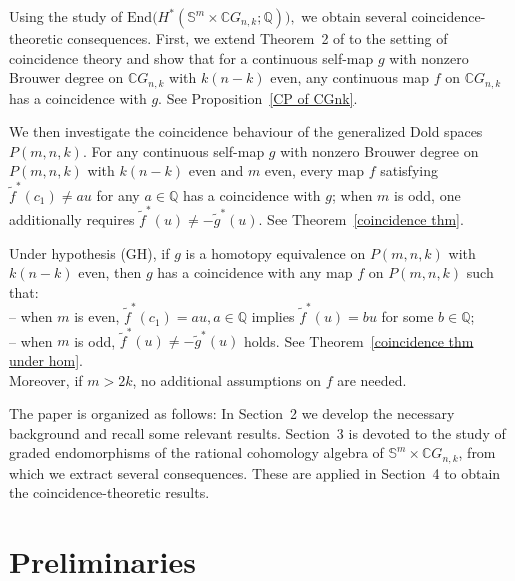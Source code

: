 \documentclass{amsart}
\begin{document}
	Using the study of $\mathrm{End}\bigl(H^*(\mathbb S^{m}\times \mathbb C G_{n,k};\mathbb Q)\bigr),$
	we obtain several coincidence-theoretic consequences. First, we extend Theorem~2 of \cite{glover-homer} to the setting of coincidence theory and show that for a continuous self-map $g$ with nonzero Brouwer degree on $\mathbb C G_{n,k}$ with $k(n-k)$ even, any continuous map $f$ on $\mathbb CG_{n,k}$ has a coincidence with $g$. See Proposition~\ref{CP of CGnk}.
	
	We then investigate the coincidence behaviour of the generalized Dold spaces $P(m,n,k)$. For any continuous self-map $g$ with nonzero Brouwer degree on $P(m,n,k)$  with $k(n-k)$ even and $m$ even, every map $f$ satisfying $\tilde f^{*}(c_1)\neq a u$ for any $a\in\mathbb Q$ has a coincidence with $g$; when $m$ is odd, one additionally requires $\tilde f^{*}(u)\neq -\tilde g^{*}(u)$. See Theorem~\ref{coincidence thm}.
	
	Under hypothesis (GH), if $g$ is a homotopy equivalence on $P(m,n,k)$ with $k(n-k)$ even, then $g$ has a coincidence with any map $f$ on $P(m,n,k)$ such that: \\ 
	-- when $m$ is even,  $\tilde f^{*}(c_1)=a u, a\in \mathbb Q$ implies $\tilde f^{*}(u)=b u$ for some $b\in\mathbb Q$;  \\
	-- when $m$ is odd,  $\tilde f^{*}(u)\neq -\tilde g^{*}(u)$ holds. See Theorem~\ref{coincidence thm under hom}.  \\
	Moreover, if $m>2k$, no additional assumptions on $f$ are needed.
	
	
	
	
	The paper is organized as follows: In Section~2 we develop the necessary background and recall some relevant results. Section~3 is devoted to the study of graded endomorphisms of the rational cohomology algebra of $\mathbb S^{m}\times \mathbb C G_{n,k}$, from which we extract several consequences. These are applied in Section~4 to obtain the coincidence-theoretic results.\fi
	
	
	
	
	
	
	
	
	
	
	
	
	
	\section{Preliminaries}  \label{section 2}
	
\end{document}
